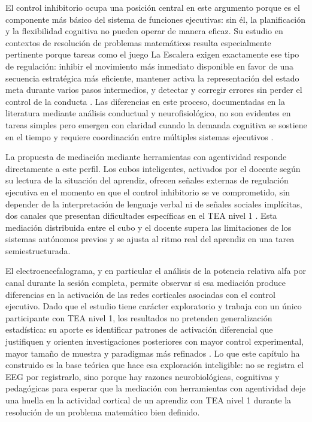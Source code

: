 \documentclass{book}
\begin{document}
El control inhibitorio ocupa una posición central en 
este argumento porque es el componente más básico del 
sistema de funciones ejecutivas: sin él, la planificación 
y la flexibilidad cognitiva no pueden operar de manera 
eficaz. Su estudio en contextos de resolución de 
problemas matemáticos resulta especialmente pertinente 
porque tareas como el juego La Escalera exigen 
exactamente ese tipo de regulación: inhibir el 
movimiento más inmediato disponible en favor de una 
secuencia estratégica más eficiente, mantener activa 
la representación del estado meta durante varios pasos 
intermedios, y detectar y corregir errores sin perder 
el control de la conducta \cite{Diamond2013, 
PaezGonzalez2022}. Las diferencias en este proceso, 
documentadas en la literatura mediante análisis 
conductual y neurofisiológico, no son evidentes en 
tareas simples pero emergen con claridad cuando la 
demanda cognitiva se sostiene en el tiempo y requiere 
coordinación entre múltiples sistemas ejecutivos 
\cite{Geurts2009, Kana2011}.

La propuesta de mediación mediante herramientas con 
agentividad responde directamente a este perfil. 
Los cubos inteligentes, activados por el docente 
según su lectura de la situación del aprendiz, 
ofrecen señales externas de regulación ejecutiva 
en el momento en que el control inhibitorio se 
ve comprometido, sin depender de la interpretación 
de lenguaje verbal ni de señales sociales implícitas, 
dos canales que presentan dificultades específicas 
en el TEA nivel 1 \cite{APA2022, PaezGonzalez2022}. 
Esta mediación distribuida entre el cubo y el 
docente supera las limitaciones de los sistemas 
autónomos previos y se ajusta al ritmo real del 
aprendiz en una tarea semiestructurada.

El electroencefalograma, y en particular el análisis 
de la potencia relativa alfa por canal durante la 
sesión completa, permite observar si esa mediación 
produce diferencias en la activación de las redes 
corticales asociadas con el control ejecutivo. 
Dado que el estudio tiene carácter exploratorio
y trabaja con un único participante con TEA nivel 1,
los resultados no pretenden generalización
estadística: su aporte es identificar patrones 
de activación diferencial que justifiquen y 
orienten investigaciones posteriores con mayor 
control experimental, mayor tamaño de muestra 
y paradigmas más refinados \cite{Klimesch1999, 
Luck2014}. Lo que este capítulo ha construido 
es la base teórica que hace esa exploración 
inteligible: no se registra el EEG por registrarlo, 
sino porque hay razones neurobiológicas, cognitivas 
y pedagógicas para esperar que la mediación con 
herramientas con agentividad deje una huella en 
la actividad cortical de un aprendiz con TEA 
nivel 1 durante la resolución de un problema 
matemático bien definido.
\end{document}
